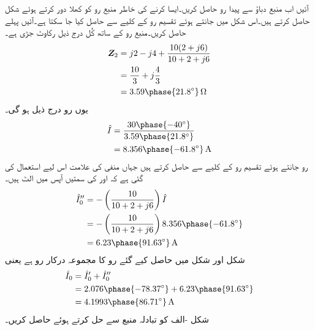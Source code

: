 آئیں اب منبع دباؤ سے پیدا رو حاصل کریں۔ایسا کرنے کی خاطر منبع رو کو کھلا دور کرتے ہوئے شکل  حاصل کرتے ہیں۔اس شکل میں  جانتے ہوئے تقسیم رو کے کلیے سے  حاصل کیا جا سکتا ہے۔آئیں پہلے  حاصل کریں۔منبع رو کے ساتھ کُل درج ذیل رکاوٹ جڑی ہے۔
\begin{align*}
\bZ_2&=j2-j4+\frac{10(2+j6)}{10+2+j6}\\
&=\frac{10}{3}+j\frac{4}{3}\\
&=3.59\phase{21.8^{\circ}}\,\si{\ohm}
\end{align*}
یوں رو  درج ذیل ہو گی۔
\begin{align*}
\hat{I}&=\frac{30\phase{-40^{\circ}}}{3.59\phase{21.8^{\circ}}}\\
&=8.356\phase{-61.8^{\circ}}\,\si{\ampere}
\end{align*}
رو  جانتے ہوئے تقسیم رو کے کلیے سے  حاصل کرتے ہیں جہاں منفی کی علامت اس لیے استعمال کی گئی ہے کہ   اور  کی سمتیں آپس میں الٹ ہیں۔
\begin{align*}
\hat{I}''_0&=-\left(\frac{10}{10+2+j6}\right) \hat{I}\\
&=-\left(\frac{10}{10+2+j6}\right) 8.356\phase{-61.8^{\circ}}\\
&=6.23\phase{91.63^{\circ}}\,\si{\ampere}
\end{align*}
شکل  اور شکل  میں حاصل کیے گئے رو کا مجموعہ درکار رو ہے یعنی
\begin{align*}
\hat{I}_0&=\hat{I}'_0+\hat{I}''_0\\
&=2.076\phase{-78.37^{\circ}}+6.23\phase{91.63^{\circ}}\\
&=4.1993\phase{86.71^{\circ}}\,\si{\ampere}
\end{align*}
شکل -الف کو تبادلہ منبع سے حل کرتے ہوئے  حاصل کریں۔

